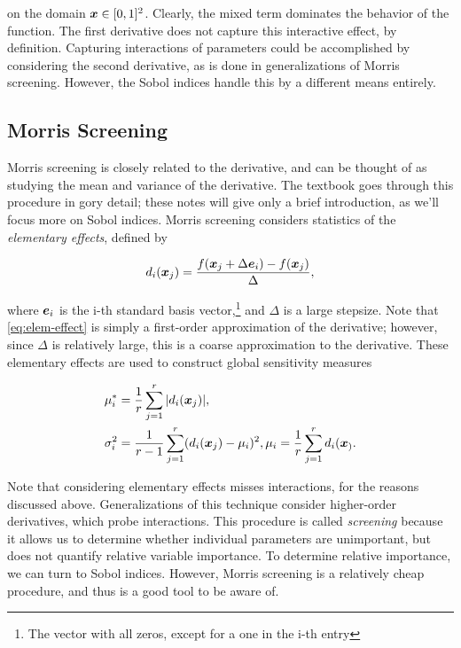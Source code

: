 \documentclass[../primer.tex]{subfiles}
\begin{document}
\noindent on the domain \(\boldsymbol{x}\in[0,1]^2\). Clearly, the mixed term dominates the
behavior of the function. The first derivative does not capture this interactive
effect, by definition. Capturing interactions of parameters could be
accomplished by considering the second derivative, as is done in generalizations
of Morris screening. However, the Sobol indices handle this by a different means
entirely.

\subsection{Morris Screening}
\label{sec:orgf5d704d}
Morris screening is closely related to the derivative, and can be thought of as
studying the mean and variance of the derivative. The textbook
\cite{smith2013uncertainty} goes through this procedure in gory detail; these
notes will give only a brief introduction, as we'll focus more on Sobol indices.
Morris screening considers statistics of the \emph{elementary effects}, defined by

\begin{equation}\label{eq:elem-effect}
  d_{i}(\boldsymbol{x}_j) = \frac{f(\boldsymbol{x}_j+\Delta \boldsymbol{e}_i) - f(\boldsymbol{x}_j)}{\Delta},
\end{equation}

\noindent where \(\boldsymbol{e}_i\) is the i-th standard basis vector,\footnote{The vector with
all zeros, except for a one in the i-th entry} and \(\Delta\) is a large stepsize.
Note that \eqref{eq:elem-effect} is simply a first-order approximation of the
derivative; however, since \(\Delta\) is relatively large, this is a coarse
approximation to the derivative. These elementary effects are used to construct
global sensitivity measures

\begin{equation}\begin{aligned}
  \mu_i^* &= \frac{1}{r}\sum_{j=1}^r |d_{i}(\boldsymbol{x}_j)|, \\
  \sigma_i^2 &= \frac{1}{r-1}\sum_{j=1}^r(d_{i}(\boldsymbol{x}_j)-\mu_i)^2, \mu_i=\frac{1}{r}\sum_{j=1}^rd_{i}(\boldsymbol{x}_).
\end{aligned}\end{equation}

Note that considering elementary effects misses interactions, for the reasons
discussed above. Generalizations of this technique consider higher-order
derivatives, which probe interactions. This procedure is called \emph{screening}
because it allows us to determine whether individual parameters are unimportant,
but does not quantify relative variable importance. To determine relative
importance, we can turn to Sobol indices. However, Morris screening is a
relatively cheap procedure, and thus is a good tool to be aware of.
\end{document}
